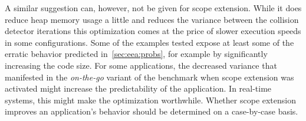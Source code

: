 		A similar suggestion can, however, not be given for scope extension. While it does reduce heap memory usage a little
		and reduces the variance between the collision detector iterations this optimization comes at the price of slower
		execution speeds in some configurations. Some of the examples tested expose at least some of the erratic behavior
		predicted in~\cref{sec:eea:probs}, for example by significantly increasing the code size. For some applications, the
		decreased variance that manifested in the \emph{on-the-go} variant of the benchmark when scope extension was
		activated might increase the predictability of the application. In real-time systems, this might make the
		optimization worthwhile. Whether scope extension improves an application's behavior should be determined on
		a case-by-case basis.
